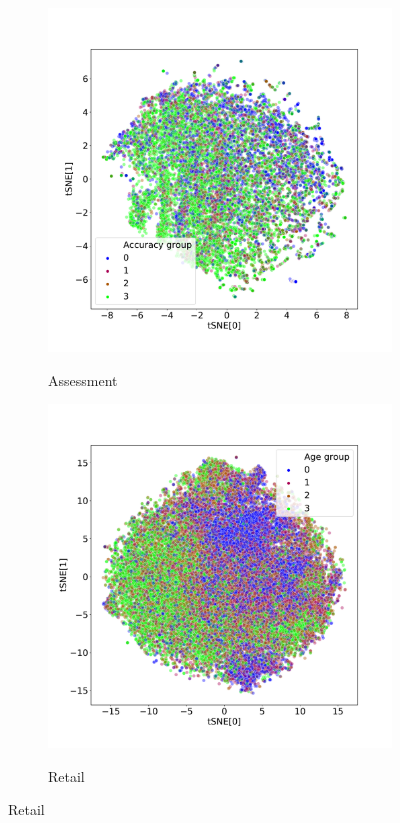 \documentclass{article}
\begin{document}
\begin{figure}
  \begin{subfigure}{0.5\textwidth}
    \caption{Assessment}
    \includegraphics[width=\textwidth]{figures/bowl-tsne-accuracy_group.pdf}
    \label{fig-tsne-bowl}
  \end{subfigure}%
  \begin{subfigure}{0.5\textwidth}
    \caption{Retail}
    \includegraphics[width=\textwidth]{figures/x5-tsne-age_bin.pdf}
    \label{fig-tsne-x5}
  \end{subfigure}
\end{figure}
\end{document}
